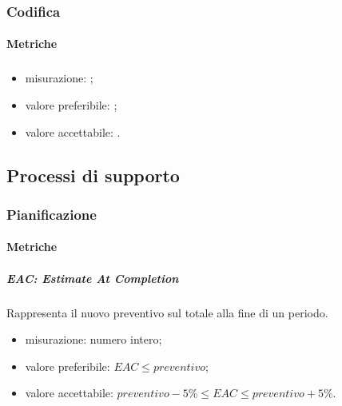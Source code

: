 	\subsubsection{Codifica}
	
		\paragraph{Metriche}
			\subparagraph{}
			\begin{itemize}
				\item misurazione: $ $;
				\item valore preferibile: $ $;
				\item valore accettabile: $ $.
			\end{itemize}
\subsection{Processi di supporto}
	\subsubsection{Pianificazione}
		\paragraph{Metriche}
			\begin{comment}
			\subparagraph{BAC: Budget At Completion}
			Budget totale allocato per il progetto. Detto anche preventivo.
			\begin{itemize}
			\item misurazione: numero intero;
			\item valore preferibile: $15132 euro$;
			\item valore accettabile: il valore del preventivo con un errore massimo del 5\%, equivale a dire $preventivo -5\% \leq BAC \leq preventivo + 5\%$. 
			\end{itemize}
			\end{comment}
			
			\subparagraph{EAC: Estimate At Completion}
			Rappresenta il nuovo preventivo sul totale alla fine di un periodo.
			\begin{itemize}
				\item  misurazione: numero intero;
				\item  valore preferibile: $ EAC \leq preventivo$;
				\item  valore accettabile: $ preventivo -5\% \leq EAC \leq preventivo + 5\%$. 
			\end{itemize}
			
